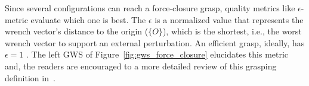 Since several configurations can reach a force-closure grasp, quality metrics like $\epsilon$-metric evaluate which one is best. The $\epsilon$ is a normalized value that represents the wrench vector's distance to the origin ($\{O\}$), which is the shortest, i.e., the worst wrench vector to support an external perturbation. An efficient grasp, ideally, has $\epsilon=1$ . The left GWS of Figure~\ref{fig:gws_force_closure} elucidates this metric and, the readers are encouraged to a more detailed review of this grasping definition in~\cite{Ferrari}.


